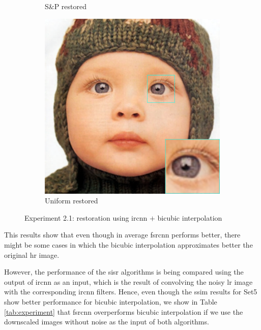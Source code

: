 \begin{figure}
\begin{subfigure}{0.24\textwidth}
		\caption{S\&P restored}
	\end{subfigure}
	\begin{subfigure}{0.24\textwidth}
		\includegraphics[width=\textwidth]{images/exp2.1/uniform.png}
		\caption{Uniform restored}
	\end{subfigure}
	\caption{Experiment 2.1: restoration using \gls{ircnn} $+$ bicubic interpolation}
	\label{fig:exp2.1}
\end{figure}

This results show that even though in average \gls{fsrcnn} performs better, there might be some cases in which the bicubic interpolation approximates better the original \gls{hr} image.

However, the performance of the \gls{sisr} algorithms is being compared using the output of \gls{ircnn} as an input, which is the result of convolving the noisy \gls{lr} image with the corresponding \gls{ircnn} filters. Hence, even though the \gls{ssim} results for Set5 show better performance for bicubic interpolation, we show in Table \ref{tab:experiment} that \gls{fsrcnn} overperforms bicubic interpolation if we use the downscaled images without noise as the input of both algorithms.

